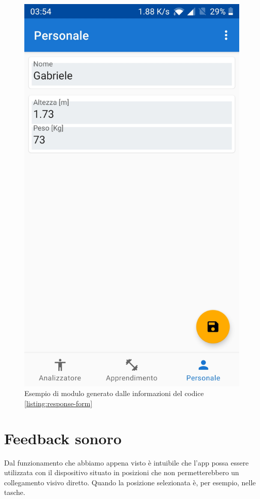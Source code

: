 \begin{figure}[H]
    \centering
    \includegraphics[scale = 0.1019]{assets/images/screenshots/3b_Layout_from_code.jpg}    
    \caption{Esempio di modulo generato dalle informazioni del codice \ref{listing:response-form}}
    \label{fig:screenshot_layout_from_code}
\end{figure}


\newpage
\section{Feedback sonoro}
Dal funzionamento che abbiamo appena visto è intuibile che l'app possa essere utilizzata con il dispositivo situato in posizioni che non permetterebbero
un collegamento visivo diretto. Quando la posizione selezionata è, per esempio, nelle tasche.

